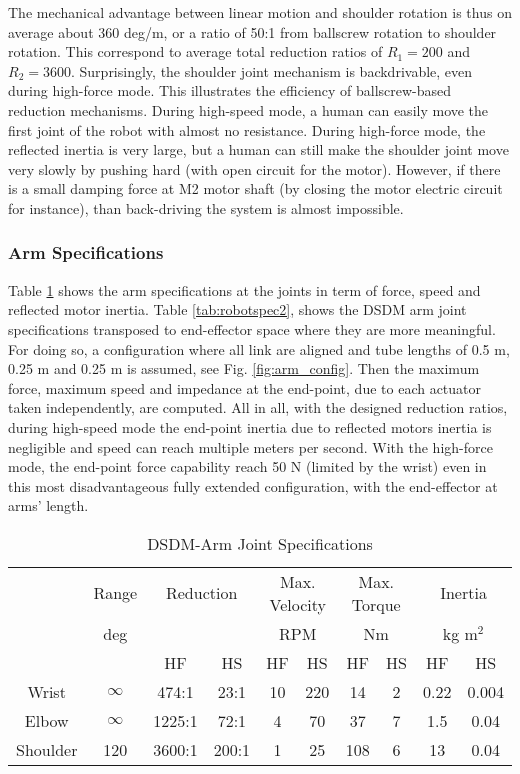 The mechanical advantage between linear motion and shoulder rotation is thus on average about 360 deg/m, or a ratio of 50:1 from ballscrew rotation to shoulder rotation. This correspond to average total reduction ratios of $R_1 = 200 $ and $R_2 = 3600 $. Surprisingly, the shoulder joint mechanism is backdrivable, even during high-force mode. This illustrates the efficiency of ballscrew-based reduction mechanisms. During high-speed mode, a human can easily move the first joint of the robot with almost no resistance. During high-force mode, the reflected inertia is very large, but a human can still make the shoulder joint move very slowly by pushing hard (with open circuit for the motor). However, if there is a small damping force at M2 motor shaft (by closing the motor electric circuit for instance), than back-driving the system is almost impossible.  


\subsubsection{Arm Specifications} 

Table \ref{tab:robotspec} shows the arm specifications at the joints in term of force, speed and reflected motor inertia. Table \ref{tab:robotspec2}, shows the DSDM arm joint specifications transposed to end-effector space where they are more meaningful. For doing so, a configuration where all link are aligned and tube lengths of 0.5 m, 0.25 m and 0.25 m is assumed, see Fig. \ref{fig:arm_config}. Then the maximum force, maximum speed and impedance at the end-point, due to each actuator taken independently, are computed. All in all, with the designed reduction ratios, during high-speed mode the end-point inertia due to reflected motors inertia is negligible and speed can reach multiple meters per second. With the high-force mode, the end-point force capability reach 50 N (limited by the wrist) even in this most disadvantageous fully extended configuration, with the end-effector at arms' length.  

\begin{table}[htbp]
	\centering
	\caption{DSDM-Arm Joint Specifications}
		\begin{tabular}{ c c c c c c c c c c }
			\hline
			   & Range  & \multicolumn{2}{c}{Reduction} & \multicolumn{2}{c}{Max. Velocity} & \multicolumn{2}{c}{Max. Torque} & \multicolumn{2}{c}{Inertia} \\
			   & deg & & &\multicolumn{2}{c}{RPM} & \multicolumn{2}{c}{Nm} & \multicolumn{2}{c}{kg m$^2$} \\
				\hline 
			  & & HF & HS & HF & HS & HF & HS & HF & HS \\
			\hline
			 Wrist & $\infty$ & 474:1  & 23:1  & 10 & 220 & 14  & 2 & 0.22 & 0.004 \\
			 Elbow & $\infty$ & 1225:1 & 72:1  & 4  & 70  & 37  & 7 & 1.5  & 0.04  \\
			 Shoulder & 120   & 3600:1 & 200:1 & 1  & 25  & 108 & 6 & 13   & 0.04  \\
			\hline
		\end{tabular}
	\label{tab:robotspec}
\end{table}

